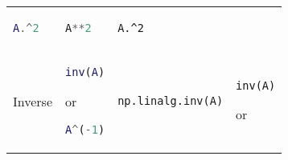 \documentclass[]{article}
\begin{document}
\begin{longtable}[]{@{}llll@{}}
\begin{minipage}[t]{0.22\columnwidth}
\begin{lstlisting}[language=Matlab]
A.^2
\end{lstlisting}
\strut
\end{minipage} & \begin{minipage}[t]{0.23\columnwidth}\raggedright\strut
\begin{lstlisting}[language=Python]
A**2
\end{lstlisting}
\strut
\end{minipage} & \begin{minipage}[t]{0.20\columnwidth}\raggedright\strut
\begin{lstlisting}
A.^2
\end{lstlisting}
\strut
\end{minipage}\tabularnewline
\begin{minipage}[t]{0.23\columnwidth}\raggedright\strut
Inverse\strut
\end{minipage} & \begin{minipage}[t]{0.22\columnwidth}\raggedright\strut
\begin{lstlisting}[language=Matlab]
inv(A)
\end{lstlisting}

or

\begin{lstlisting}[language=Matlab]
A^(-1)
\end{lstlisting}
\strut
\end{minipage} & \begin{minipage}[t]{0.23\columnwidth}\raggedright\strut
\begin{lstlisting}[language=Python]
np.linalg.inv(A)
\end{lstlisting}
\strut
\end{minipage} & \begin{minipage}[t]{0.20\columnwidth}\raggedright\strut
\begin{lstlisting}
inv(A)
\end{lstlisting}

or


\end{minipage}
\end{longtable}
\end{document}
